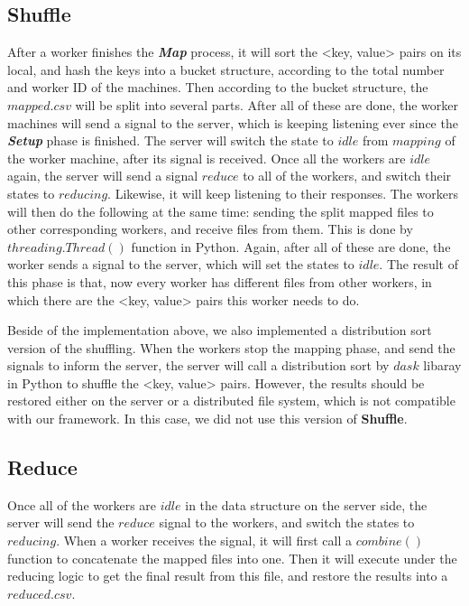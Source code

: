 \documentclass{article}
\begin{document}
	\subsection{Shuffle}
		After a worker finishes the \textit{\textbf{Map}} process, it will sort the <key, value> pairs on its local, and hash the keys into a bucket structure, according to the total number and worker ID of the machines. Then according to the bucket structure, the $mapped.csv$ will be split into several parts. After all of these are done, the worker machines will send a signal to the server, which is keeping listening ever since the \textit{\textbf{Setup}} phase is finished. The server will switch the state to $idle$ from $mapping$ of the worker machine, after its signal is received. Once all the workers are $idle$ again, the server will send a signal $reduce$ to all of the workers, and switch their states to $reducing$. Likewise, it will keep listening to their responses. The workers will then do the following at the same time: sending the split mapped files to other corresponding workers, and receive files from them. This is done by $threading.Thread()$ function in Python. Again, after all of these are done, the worker sends a signal to the server, which will set the states to $idle$. The result of this phase is that, now every worker has different files from other workers, in which there are the <key, value> pairs this worker needs to do.
		
		Beside of the implementation above, we also implemented a distribution sort version of the shuffling. When the workers stop the mapping phase, and send the signals to inform the server, the server will call a distribution sort by $dask$ libaray in Python to shuffle the <key, value> pairs. However, the results should be restored either on the server or a distributed file system, which is not compatible with our framework. In this case, we did not use this version of \textbf{\textbf{Shuffle}}.
		
	\subsection{Reduce}
		Once all of the workers are $idle$ in the data structure on the server side, the server will send the $reduce$ signal to the workers, and switch the states to $reducing$. When a worker receives the signal, it will first call a $combine()$ function to concatenate the mapped files into one. Then it will execute under the reducing logic to get the final result from this file, and restore the results into a $reduced.csv$.
	
\end{document}
